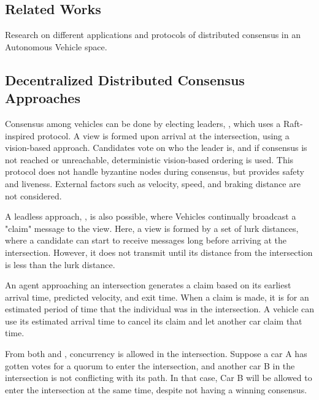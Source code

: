 \documentclass[fleqn,10pt]{olplainarticle}
\begin{document}
\subsection*{Related Works}

Research on different applications and protocols of distributed consensus in an Autonomous Vehicle space. 


\subsection{Decentralized Distributed Consensus Approaches}
Consensus among vehicles can be done by electing leaders, \cite{lee2025distributedconsensusalgorithmprioritizing}, which uses a Raft-inspired protocol. A view is formed upon arrival at the intersection, using a vision-based approach. 
Candidates vote on who the leader is, and if consensus is not reached or unreachable, deterministic vision-based ordering is used. This protocol does not handle byzantine nodes during consensus, but provides safety and liveness. External factors such as velocity, speed, and braking distance are not considered. 


A leadless approach, \cite{inproceedings}, is also possible, where Vehicles continually broadcast a "claim" message to the view. Here, a view is formed by a set of lurk distances, where a candidate can start to receive messages long before arriving at the intersection. However, it does not transmit until its distance from the intersection is less than the lurk distance.  

An agent approaching an intersection generates a claim based on its earliest arrival time, predicted velocity, and exit time. When a claim is made, it is for an estimated period of time that the individual was in the intersection. 
A vehicle can use its estimated arrival time to cancel its claim and let another car claim that time. 

From both \cite{inproceedings} and \cite{lee2025distributedconsensusalgorithmprioritizing}, concurrency is allowed in the intersection. Suppose a car A has gotten votes for a quorum to enter the intersection, and another car B in the intersection is not conflicting with its path. In that case, Car B will be allowed to enter the intersection at the same time, despite not having a winning consensus. 







\end{document}
